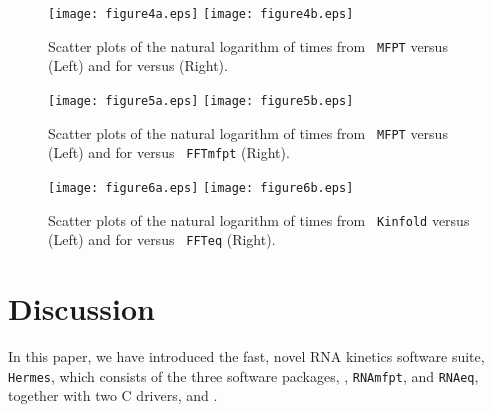 \begin{figure}
\centering
\texttt{[image: figure4a.eps]}
\texttt{[image: figure4b.eps]}
\caption{ Scatter plots of the natural logarithm of times from {\tt
MFPT} versus \rnaeq (Left) and for \kinfold versus
\rnaeq (Right). }
\label{fig:scatterplot_single_bp_moves_for_kinfold_vs_rnaeq}
\end{figure}


\begin{figure}
\centering
\texttt{[image: figure5a.eps]}
\texttt{[image: figure5b.eps]}
\caption{ Scatter plots of the natural logarithm of times from {\tt
MFPT} versus \kinfold (Left) and for \rnamfpt versus {\tt
FFTmfpt} (Right). }
\label{fig:scatterplot_single_bp_moves_for_actual_mfpt_vs_fftbor2d}
\end{figure}


\begin{figure}
\centering
\texttt{[image: figure6a.eps]}
\texttt{[image: figure6b.eps]}
\caption{ Scatter plots of the natural logarithm of times from {\tt
Kinfold} versus \fftmfpt (Left) and for \fftmfpt versus {\tt
FFTeq} (Right). }
\label{fig:scatterplot_single_bp_moves_for_fftbor2d_vs_rnapopulation}
\end{figure}



\section{Discussion}
\label{section:discussion}

In this paper, we have introduced
the fast, novel RNA kinetics software suite, {\tt
Hermes}, which consists of the three software packages, \ffttwo,
{\tt RNAmfpt}, and {\tt RNAeq},  together with two C drivers,
\fftmfpt and \ffteq.

